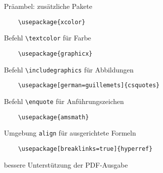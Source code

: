 \begin{frame}[fragile]{Präambel: zusätzliche Pakete}

  \begin{lstlisting}
    \usepackage{xcolor}
  \end{lstlisting}
  Befehl \lstinline-\textcolor- für Farbe

  \begin{lstlisting}
    \usepackage{graphicx}  
  \end{lstlisting}
  Befehl \lstinline-\includegraphics- für Abbildungen

  \begin{lstlisting}
    \usepackage[german=guillemets]{csquotes}
  \end{lstlisting}
  Befehl \lstinline-\enquote- für Anführungszeichen

  \begin{lstlisting}
    \usepackage{amsmath}
  \end{lstlisting}
  Umgebung \lstinline-align- für ausgerichtete Formeln

  \begin{lstlisting}
    \usepackage[breaklinks=true]{hyperref}
  \end{lstlisting}
  bessere Unterstützung der PDF-Ausgabe
\end{frame}
